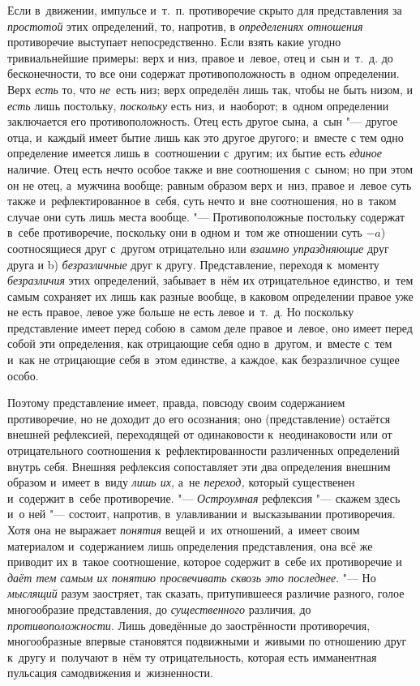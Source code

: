 Если в~движении, импульсе и~т.~п. противоречие скрыто для представления за
{\em простотой} этих определений, то, напротив, в
{\em определениях отношения} противоречие выступает
непосредственно. Если взять какие угодно тривиальнейшие примеры: верх и
низ, правое и~левое, отец и~сын и~т.~д. до бесконечности, то все они
содержат противоположность в~одном определении. Верх
{\em есть} то, что {\em не}~есть
низ; верх определён лишь так, чтобы не быть низом, и
{\em есть} лишь постольку, {\em поскольку} есть низ, и~наоборот; в~одном
определении заключается его противоположность. Отец есть другое сына, а~сын
"--- другое отца, и~каждый имеет бытие лишь как это другое другого; и~вместе с
тем одно определение имеется лишь в~соотношении с~другим; их бытие есть
{\em единое} наличие. Отец есть нечто особое также и
вне соотношения с~сыном; но при этом он не отец, а~мужчина вообще; равным
образом верх и~низ, правое и~левое суть также и~рефлектированное в~себя,
суть нечто и~вне соотношения, но в~таком случае они суть лишь места вообще.
"--- Противоположные постольку содержат в~себе противоречие, поскольку они в
одном и~том же отношении суть $-a$) соотносящиеся
друг с~другом отрицательно или {\em взаимно
упраздняющие} друг друга и b) {\em безразличные} друг к
другу. Представление, переходя к~моменту
{\em безразличия} этих определений, забывает в~нём их
отрицательное единство, и~тем самым сохраняет их лишь как разные вообще, в
каковом определении правое уже не есть правое, левое уже больше не есть
левое и~т.~д. Но поскольку представление имеет перед собою в~самом деле
правое и~левое, оно имеет перед собой эти определения, как отрицающие себя
одно в~другом, и~вместе с~тем и~как не отрицающие себя в~этом единстве, а
каждое, как безразличное сущее особо.

Поэтому представление имеет, правда, повсюду своим содержанием противоречие,
но не доходит до его осознания; оно (представление) остаётся внешней
рефлексией, переходящей от одинаковости к~неодинаковости или от
отрицательного соотношения к~рефлектированности различенных определений
внутрь себя. Внешняя рефлексия сопоставляет эти два определения внешним
образом и~имеет в~виду {\em лишь их,} а~не
{\em переход,} который существенен и~содержит в~себе
противоречие. "--- {\em Остроумная} рефлексия "--- скажем
здесь и~о ней "--- состоит, напротив, в~улавливании и~высказывании
противоречия. Хотя она не выражает {\em понятия} вещей
и~их отношений, а~имеет своим материалом и~содержанием лишь определения
представления, она всё же приводит их в~такое соотношение, которое содержит
в~себе их противоречие и {\em даёт тем самым их понятию
просвечивать сквозь это последнее}. "--- Но {\em мыслящий}
разум заостряет, так сказать, притупившееся различие разного, голое
многообразие представления, до {\em существенного}
различия, до {\em противоположности}. Лишь доведённые
до заострённости противоречия, многообразные впервые становятся подвижными
и~живыми по отношению друг к~другу и~получают в~нём ту отрицательность,
которая есть имманентная пульсация самодвижения и~жизненности.

